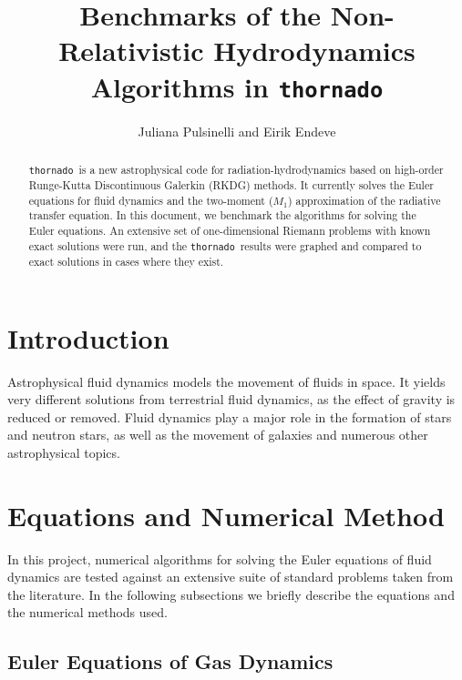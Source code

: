 \documentclass[10pt,preprint]{aastex}
\newcommand{\thornado}{\texttt{thornado}}
\begin{document}
\title{Benchmarks of the Non-Relativistic Hydrodynamics Algorithms in \thornado}
\author{Juliana Pulsinelli and Eirik Endeve}


\begin{abstract}
\thornado\ is a new astrophysical code for radiation-hydrodynamics based on high-order Runge-Kutta Discontinuous Galerkin (RKDG) methods.  
It currently solves the Euler equations for fluid dynamics and the two-moment ($M_{1}$) approximation of the radiative transfer equation. 
In this document, we benchmark the algorithms for solving the Euler equations.  
An extensive set of one-dimensional Riemann problems with known exact solutions were run, and the \thornado\ results were graphed and compared to exact solutions in cases where they exist. 
\end{abstract}

\tableofcontents

\section{Introduction}

Astrophysical fluid dynamics models the movement of fluids in space. It yields very different solutions from terrestrial fluid dynamics, as the effect of gravity is reduced or removed. 
Fluid dynamics play a major role in the formation of stars and neutron stars, as well as the movement of galaxies and numerous other astrophysical topics.  

\section{Equations and Numerical Method}

In this project, numerical algorithms for solving the Euler equations of fluid dynamics are tested against an extensive suite of standard problems taken from the literature.  
In the following subsections we briefly describe the equations and the numerical methods used.  

\subsection{Euler Equations of Gas Dynamics}
\end{document}
